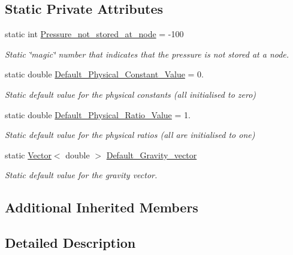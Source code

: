 \subsection*{Static Private Attributes}
\begin{DoxyCompactItemize}
\item 
static int \hyperlink{classoomph_1_1NavierStokesEquations_a2491a4baf9df02251bac1ad549a72389}{Pressure\+\_\+not\+\_\+stored\+\_\+at\+\_\+node} = -\/100
\begin{DoxyCompactList}\small\item\em Static \char`\"{}magic\char`\"{} number that indicates that the pressure is not stored at a node. \end{DoxyCompactList}\item 
static double \hyperlink{classoomph_1_1NavierStokesEquations_aaa7d71747f0b5f3a529c5e7a54668af9}{Default\+\_\+\+Physical\+\_\+\+Constant\+\_\+\+Value} = 0.
\begin{DoxyCompactList}\small\item\em Static default value for the physical constants (all initialised to zero) \end{DoxyCompactList}\item 
static double \hyperlink{classoomph_1_1NavierStokesEquations_ab9a614a9885d8fbdcc6f07e3a5ffa9ee}{Default\+\_\+\+Physical\+\_\+\+Ratio\+\_\+\+Value} = 1.
\begin{DoxyCompactList}\small\item\em Static default value for the physical ratios (all are initialised to one) \end{DoxyCompactList}\item 
static \hyperlink{classoomph_1_1Vector}{Vector}$<$ double $>$ \hyperlink{classoomph_1_1NavierStokesEquations_ad3629ee3ecfa6aa1e59a0776ed700fd1}{Default\+\_\+\+Gravity\+\_\+vector}
\begin{DoxyCompactList}\small\item\em Static default value for the gravity vector. \end{DoxyCompactList}\end{DoxyCompactItemize}
\subsection*{Additional Inherited Members}


\subsection{Detailed Description}
